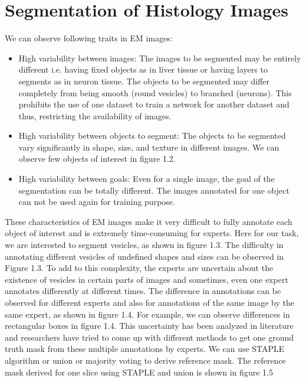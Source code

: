 \section{Segmentation of Histology Images}
 We can observe following traits in EM images:
\begin{itemize}
\item High variability between images: The images to be segmented may be entirely different i.e. having fixed objects as in liver tissue or having layers to segments as in neuron tissue. The objects to be segmented may differ completely from being smooth (round vesicles) to branched (neurons). This prohibits the use of one dataset to train a network for another dataset and thus, restricting the availability of images.
\item High variability between objects to segment: The objects to be segmented vary significantly in shape, size, and texture in different images. We can observe few objects of interest in figure 1.2.
\item High variability between goals: Even for a single image, the goal of the segmentation can be totally different. The images annotated for one object can not be used again for training purpose.
\end{itemize}
These characteristics of EM images make it very difficult to fully annotate each object of interest and is extremely time-consuming for experts. Here for our task, we are interested to segment vesicles, as shown in figure 1.3. The difficulty in annotating different vesicles of undefined shapes and sizes can be observed in Figure 1.3. To add to this complexity, the experts are uncertain about the existence of vesicles in certain parts of images and sometimes, even one expert annotates differently at different times. The difference in annotations can be observed for different experts and also for annotations of the same image by the same expert, as shown in figure 1.4. For example, we can observe differences in rectangular boxes in figure 1.4. This uncertainty has been analyzed in literature and researchers have tried to come up with different methods to get one ground truth mask from these multiple annotations by experts. We can use STAPLE \cite{staple} algorithm or union or majority voting to derive reference mask. The reference mask derived for one slice using STAPLE and union is shown in figure 1.5\par



